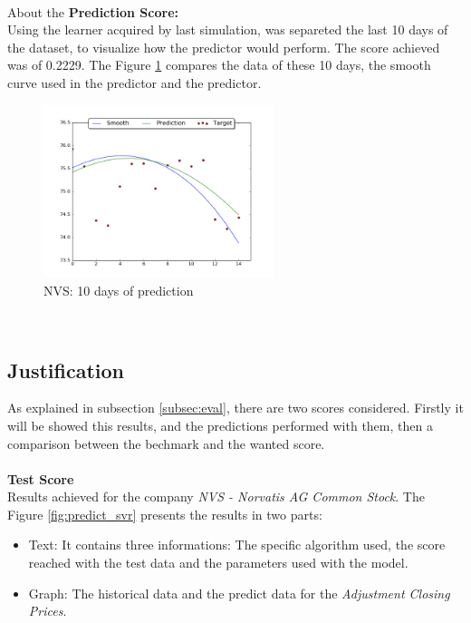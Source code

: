\\
About the \textbf{Prediction Score:}\\
Using the learner acquired by last simulation, was separeted the last 10 days of the dataset, to visualize how the predictor would perform. The score achieved was of 0.2229. The Figure \ref{fig:pred_10} 
compares the data of these 10 days, the smooth curve used in the predictor and the predictor.
\begin{figure}[H]
\centering
\includegraphics[width=0.6\textwidth]{figures/pred_10.png}
\caption{NVS: 10 days of prediction}
\label{fig:pred_10}
\end{figure}
\ \\


\subsection{Justification}
As explained in subsection \ref{subsec:eval}, there are two scores considered. Firstly it will be showed this results, and the predictions performed with them, then a comparison between the bechmark and the 
wanted score.\\
\\
\textbf{Test Score}\\
Results achieved for the company \textit{NVS - Norvatis AG Common Stock}.
The Figure \ref{fig:predict_svr} presents the results in two parts: 
\begin{itemize}
	\item Text: It contains three informations: The specific algorithm used, the  score reached with the test data and the parameters used with the model.\\
	\item Graph: The historical data and the predict data for the \textit{Adjustment Closing Prices}.\\
\end{itemize}

